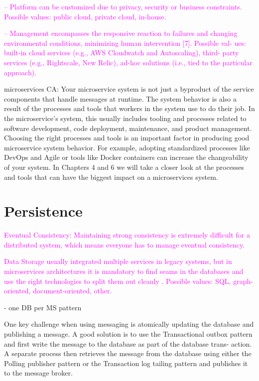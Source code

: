 \documentclass[thesis=M,english,hidelinks]{FITthesis}[2012/10/20]
\begin{document}
\textcolor{magenta}{– Platform can be customized due to privacy, security or business constraints. Possible values: public cloud, private cloud, in-house.}

\textcolor{magenta}{– Management encompasses the responsive reaction to failures and changing environmental conditions, minimizing human intervention [7]. Possible val- ues: built-in cloud services (e.g., AWS Cloudwatch and Autoscaling), third- party services (e.g., Rightscale, New Relic), ad-hoc solutions (i.e., tied to the particular approach).}


microservices CA:
Your microservice system is not just a byproduct of the service components that handle messages at runtime. The system behavior is also a result of the processes and tools that workers in the system use to do their job. In the microservice’s system, this usually includes tooling and processes related to software development, code deployment, maintenance, and product management.
Choosing the right processes and tools is an important factor in producing good microservice system behavior. For example, adopting standardized processes like DevOps and Agile or tools like Docker containers can increase the changeability of your system. In Chapters 4 and 6 we will take a closer look at the processes and tools that can have the biggest impact on a microservices system.

% 
% 
\section{Persistence}




\textcolor{magenta}{Eventual Consistency: Maintaining strong consistency is extremely difficult for a distributed system, which means everyone has to manage eventual consistency.}

\textcolor{magenta}{Data Storage usually integrated multiple services in legacy systems, but in microservices architectures it is mandatory to find seams in the databases and use the right technologies to split them out cleanly \cite{ms-building-ms}. Possible values: SQL, graph-oriented, document-oriented, other.}

- one DB per MS pattern 

One key challenge when using messaging is atomically updating the database and publishing a message. A good solution is to use the Transactional outbox pattern and first write the message to the database as part of the database trans- action. A separate process then retrieves the message from the database using either the Polling publisher pattern or the Transaction log tailing pattern and publishes it to the message broker.
\end{document}
